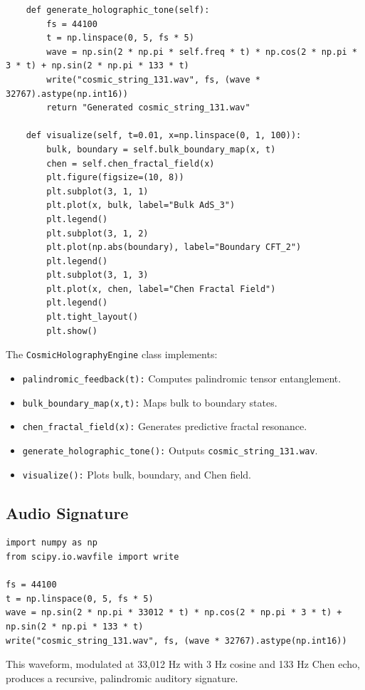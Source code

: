 \documentclass[12pt]{article}
\begin{document}
\begin{algorithm}
\begin{lstlisting}
    def generate_holographic_tone(self):
        fs = 44100
        t = np.linspace(0, 5, fs * 5)
        wave = np.sin(2 * np.pi * self.freq * t) * np.cos(2 * np.pi * 3 * t) + np.sin(2 * np.pi * 133 * t)
        write("cosmic_string_131.wav", fs, (wave * 32767).astype(np.int16))
        return "Generated cosmic_string_131.wav"

    def visualize(self, t=0.01, x=np.linspace(0, 1, 100)):
        bulk, boundary = self.bulk_boundary_map(x, t)
        chen = self.chen_fractal_field(x)
        plt.figure(figsize=(10, 8))
        plt.subplot(3, 1, 1)
        plt.plot(x, bulk, label="Bulk AdS_3")
        plt.legend()
        plt.subplot(3, 1, 2)
        plt.plot(np.abs(boundary), label="Boundary CFT_2")
        plt.legend()
        plt.subplot(3, 1, 3)
        plt.plot(x, chen, label="Chen Fractal Field")
        plt.legend()
        plt.tight_layout()
        plt.show()
\end{lstlisting}
\end{algorithm}
The \texttt{CosmicHolographyEngine} class implements:
\begin{itemize}
    \item \texttt{palindromic\_feedback(t):} Computes palindromic tensor entanglement.
    \item \texttt{bulk\_boundary\_map(x,t):} Maps bulk to boundary states.
    \item \texttt{chen\_fractal\_field(x):} Generates predictive fractal resonance.
    \item \texttt{generate\_holographic\_tone():} Outputs \texttt{cosmic\_string\_131.wav}.
    \item \texttt{visualize():} Plots bulk, boundary, and Chen field.
\end{itemize}

\subsection{Audio Signature}
\begin{lstlisting}
import numpy as np
from scipy.io.wavfile import write

fs = 44100
t = np.linspace(0, 5, fs * 5)
wave = np.sin(2 * np.pi * 33012 * t) * np.cos(2 * np.pi * 3 * t) + np.sin(2 * np.pi * 133 * t)
write("cosmic_string_131.wav", fs, (wave * 32767).astype(np.int16))
\end{lstlisting}
This waveform, modulated at 33,012 Hz with 3 Hz cosine and 133 Hz Chen echo, produces a recursive, palindromic auditory signature.
\end{document}
